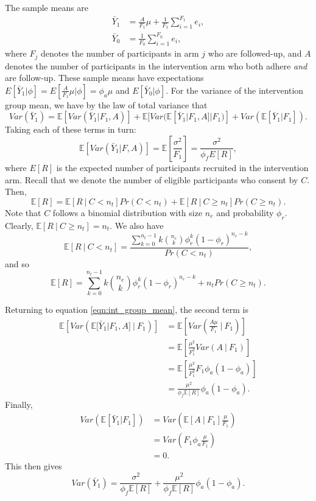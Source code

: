 \documentclass[AMA,STIX1COL]{WileyNJD-v2}
\begin{document}
\appendix

The sample means are
\begin{align*}
\bar{Y}_1 &= \frac{A}{F_1}\mu + \frac{1}{F_1} \sum_{i=1}^{F_1} e_i, \\
\bar{Y}_0 &= \frac{1}{F_0}\sum_{i=1}^{F_0} e_i,
\end{align*}
where $F_j$ denotes the number of participants in arm $j$ who are followed-up, and $A$ denotes the number of participants in the intervention arm who both adhere \emph{and} are follow-up. These sample means have expectations $E[\bar{Y}_1 | \phi] = E[\frac{A}{F_1}\mu | \phi] = \phi_a \mu$ and $E[\bar{Y}_0 | \phi]$. For the variance of the intervention group mean, we have by the law of total variance that
\begin{equation}\label{eqn:int_group_mean}
Var(\bar{Y}_1) = \mathbb{E}[Var(\bar{Y}_1 | F_1, A)] + 
\mathbb{E}[Var(\mathbb{E}[\bar{Y}_1 | F_1, A] | F_1)] + 
Var(\mathbb{E}[\bar{Y}_1 | F_1]).
\end{equation}
Taking each of these terms in turn:
$$
\mathbb{E}[Var(\bar{Y}_1 | F, A)] = \mathbb{E} \left[ \frac{\sigma^2}{F_1} \right] = \frac{\sigma^2}{\phi_f E[R]},
$$
where $E[R]$ is the expected number of participants recruited in the intervention arm. Recall that we denote the number of eligible participants who consent by $C$. Then,
$$
\mathbb{E}[R] = \mathbb{E}[R ~|~ C < n_t] Pr(C < n_t) + \mathbb{E}[R ~|~ C \geq n_t] Pr(C \geq n_t).
$$
Note that $C$ follows a binomial distribution with size $n_e$ and probability $\phi_r$. Clearly, $\mathbb{E}[R ~|~ C \geq n_t] = n_t$. We also have
$$
\mathbb{E}[R ~|~ C < n_t] = \frac{\sum_{k=0}^{n_t-1} k{n_e \choose k} \phi_r^k (1-\phi_r)^{n_e - k} } {Pr(C < n_t)},
$$
and so 
$$
\mathbb{E}[R] = \sum_{k=0}^{n_t-1} k{n_e \choose k} \phi_r^k (1-\phi_r)^{n_e - k} + n_t Pr(C \geq n_t).
$$

Returning to equation \ref{eqn:int_group_mean}, the second term is 
\begin{align*}
\mathbb{E} \left[ Var(\mathbb{E}[\bar{Y}_1 | F_1, A] ~|~ F_1) \right] &= \mathbb{E} \left[ Var \left(\frac{A\mu}{F_1} ~|~ F_1 \right) \right] \\
&= \mathbb{E} \left[\frac{\mu^2}{F_1^2} Var(A ~|~ F_1) \right] \\
&= \mathbb{E} \left[ \frac{\mu^2}{F_1^2} F_1 \phi_a (1-\phi_a) \right] \\
&= \frac{\mu^2}{\phi_f \mathbb{E}[R]} \phi_a (1-\phi_a).
\end{align*}
Finally,
\begin{align*}
Var(\mathbb{E}[\bar{Y}_1 | F_1]) &= Var \left( \mathbb{E} \left[ A ~|~ F_1 \right] \frac{\mu}{F_1} \right) \\
&= Var \left( F_1 \phi_a \frac{\mu}{F_1} \right) \\
&= 0.
\end{align*}
This then gives
$$
Var(\bar{Y}_1) = \frac{\sigma^2}{\phi_f \mathbb{E}[R]} + \frac{\mu^2}{\phi_f \mathbb{E}[R]} \phi_a (1-\phi_a).
$$
\end{document}
